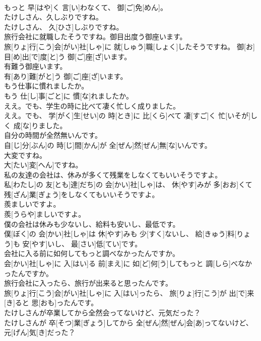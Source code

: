 \documentclass[8pt]{extreport}
\begin{document}
\begin{CJK}{UTF8}{min}
\\	もっと 早[はや]く 言[い]わなくて、 御[ご]免[めん]。
\\	たけしさん、久しぶりですね。	
\\	たけしさん、 久[ひさ]しぶりですね。
\\	旅行会社に就職したそうですね。御目出度う御座います。	
\\	旅[りょ]行[こう]会[がい]社[しゃ]に 就[しゅう]職[しょく]したそうですね。 御[お]目[め]出[で]度[と]う 御[ご]座[ざ]います。
\\	有難う御座います。	
\\	有[あり]難[がと]う 御[ご]座[ざ]います。
\\	もう仕事に慣れましたか。	
\\	もう 仕[し]事[ごと]に 慣[な]れましたか。
\\	ええ。でも、学生の時に比べて凄く忙しく成りました。	
\\	ええ。でも、 学[がく]生[せい]の 時[とき]に 比[くら]べて 凄[すご]く 忙[いそが]しく 成[な]りました。
\\	自分の時間が全然無いんです。	
\\	自[じ]分[ぶん]の 時[じ]間[かん]が 全[ぜん]然[ぜん]無[な]いんです。
\\	大変ですね。	
\\	大[たい]変[へん]ですね。
\\	私の友達の会社は、休みが多くて残業をしなくてもいいそうですよ。	
\\	私[わたし]の 友[とも]達[だち]の 会[かい]社[しゃ]は、 休[やす]みが 多[おお]くて 残[ざん]業[ぎょう]をしなくてもいいそうですよ。
\\	羨ましいですよ。	
\\	羨[うらや]ましいですよ。
\\	僕の会社は休みも少ないし、給料も安いし、最低です。	
\\	僕[ぼく]の 会[かい]社[しゃ]は 休[やす]みも 少[すく]ないし、 給[きゅう]料[りょう]も 安[やす]いし、 最[さい]低[てい]です。
\\	会社に入る前に如何してもっと調べなかったんですか。	
\\	会[かい]社[しゃ]に 入[はい]る 前[まえ]に 如[ど]何[う]してもっと 調[しら]べなかったんですか。
\\	旅行会社に入ったら、旅行が出来ると思ったんです。	
\\	旅[りょ]行[こう]会[がい]社[しゃ]に 入[はい]ったら、 旅[りょ]行[こう]が 出[で]来[き]ると 思[おも]ったんです。
\\	たけしさんが卒業してから全然会ってないけど、元気だった？	
\\	たけしさんが 卒[そつ]業[ぎょう]してから 全[ぜん]然[ぜん]会[あ]ってないけど、 元[げん]気[き]だった？

\end{CJK}
\end{document}
